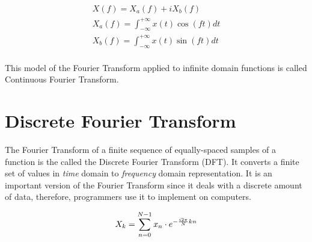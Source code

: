 \documentclass[
  oneside,
  11pt, a4paper,
  footinclude=true,
  headinclude=true,
  cleardoublepage=empty
]{scrbook}
\newcommand{\eqname}[1]{\tag*{#1}}%
\begin{document}
\begin{equation}
    \begin{split}
        X(f) = X_{a}(f) + i X_{b}(f) \\
        X_{a}(f) = \int_{-\infty}^{+\infty} x(t) \cos (f t) dt \\
        X_{b}(f) = \int_{-\infty}^{+\infty} x(t) \sin (f t) dt \\
    \end{split}
\end{equation}




This model of the Fourier Transform applied to infinite domain functions is called Continuous Fourier Transform. %


\section{Discrete Fourier Transform} \label{sec:discrete-fourier-transform}


The Fourier Transform of a finite sequence of equally-spaced samples of a function is the called the Discrete Fourier Transform (DFT). It converts a finite set of values in \textit{time} domain to \textit{frequency} domain representation. It is an important version of the Fourier Transform since it deals with a discrete amount of data, therefore, programmers use it to implement on computers.

\begin{equation} \label{eq:forward-discrete-fourier-transform}
    X_{k} = \sum_{n=0}^{N-1}x_{n} \cdot e^{- \frac{i 2 \pi}{N}kn} \\ %
\end{equation}
\end{document}
